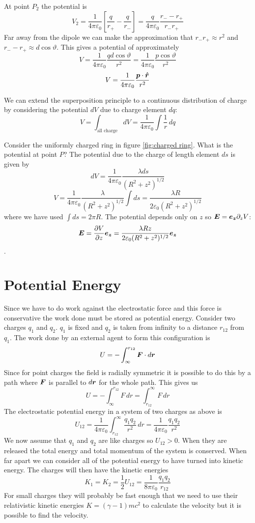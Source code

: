 \documentclass{article}
\begin{document}
    At point \(P_2\) the potential is
    \[V_2 = \frac{1}{4\pi\varepsilon_0}\left[\frac{q}{r_+} - \frac{q}{r_-}\right] = \frac{q}{4\pi\varepsilon_0}\frac{r_- - r_+}{r_-r_+}\]
    Far away from the dipole we can make the approximation that \(r_-r_+ \approx r^2\) and \(r_- - r_+\approx d\cos\vartheta\).
    This gives a potential of approximately
    \[V = \frac{1}{4\pi\varepsilon_0}\frac{qd\cos\vartheta}{r^2} = \frac{1}{4\pi\varepsilon_0}\frac{p\cos\vartheta}{r^2}\]
    \[V = \frac{1}{4\pi\varepsilon_0}\frac{\bm{p}\cdot\bm{\hat{r}}}{r^2}\]
    
    We can extend the superposition principle to a continuous distribution of charge by considering the potential \(dV\) due to charge element \(dq\):
    \[V = \int_\text{all charge}dV = \frac{1}{4\pi\varepsilon_0}\int\frac{1}{r}\,dq\]
    
    \example
    Consider the uniformly charged ring in figure \ref{fig:charged ring}.
    What is the potential at point \(P\)?
    The potential due to the charge of length element \(ds\) is given by
    \[dV = \frac{1}{4\pi\varepsilon_0}\frac{\lambda ds}{(R^2 + z^2)^{1/2}}\]
    \[V = \frac{1}{4\pi\varepsilon_0}\frac{\lambda}{(R^2 + z^2)^{1/2}}\int ds = \frac{\lambda R}{2\varepsilon_0(R^2 + z^2)^{1/2}}\]
    where we have used \(\int ds = 2\pi R\).
    The potential depends only on \(z\) so \(\bm{E} = \bm{e_{z}}\partial_z V\):
    \[\bm{E} = \pdv{V}{z}\bm{e_{z}} = \frac{\lambda Rz}{2\varepsilon_0(R^2 + z^2)^{1/2}}\bm{e_{z}}\].
    
    \section{Potential Energy}
    Since we have to do work against the electrostatic force and this force is conservative the work done must be stored as potential energy.
    Consider two charges \(q_1\) and \(q_2\). \(q_1\) is fixed and \(q_2\) is taken from infinity to a distance \(r_{12}\) from \(q_1\).
    The work done by an external agent to form this configuration is
    \[U = -\int_\infty^{r_{12}}\bm{F}\cdot d\bm{r}\]
    Since for point charges the field is radially symmetric it is possible to do this by a path where \(\bm{F}\) is parallel to \(d\bm{r}\) for the whole path.
    This gives us
    \[U = -\int_\infty^{r_{12}}F\,dr = \int_{r_{12}}^\infty F\,dr\]
    The electrostatic potential energy in a system of two charges as above is
    \[U_{12} = \frac{1}{4\pi\varepsilon_0}\int_{r_{12}}^\infty \frac{q_1q_2}{r^2}\,dr = \frac{1}{4\pi\varepsilon_0}\frac{q_1q_2}{r^2}\]
    We now assume that \(q_1\) and \(q_2\) are like charges so \(U_{12} > 0\). When they are released the total energy and total momentum of the system is conserved.
    When far apart we can consider all of the potential energy to have turned into kinetic energy.
    The charges will then have the kinetic energies
    \[K_1 = K_2 = \frac{1}{2}U_{12} = \frac{1}{8\pi\varepsilon_0}\frac{q_1q_2}{r_{12}}\]
    For small charges they will probably be fast enough that we need to use their relativistic kinetic energies \(K = (\gamma - 1)mc^2\) to calculate the velocity but it is possible to find the velocity.
    
\end{document}

